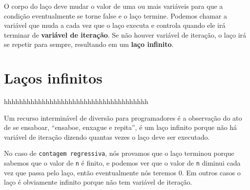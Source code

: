 

O corpo do laço deve mudar o valor de uma ou mais variáveis para que a
condição eventualmente se torne false e o laço termine. Podemos chamar a
variável que muda a cada vez que o laço executa e controla quando ele irá
terminar de {\bf variável de iteração}. Se não houver variável de iteração,
o laço irá se repetir para sempre, resultando em um {\bf laço infinito}.

\section{Laços infinitos}

hhhhhhhhhhhhhhhhhhhhhhhhhhhhhhhhhhhhhh


Um recurso interminável de diversão para programadores é a observação do ato
de se ensaboar, ``ensaboe, enxague e repita'', é um laço infinito porque não
há variável de iteração dizendo quantas vezes o laço deve ser executado.



No caso de {\tt contagem regressiva}, nós provamos que o laço terminou porque
sabemos que o valor de {\tt n} é finito, e podemos ver que o valor de {\tt n}
diminui cada vez que passa pelo laço, então eventualmente nós teremos 0. Em
outros casos o laço é obviamente infinito porque não tem variável de iteração.

